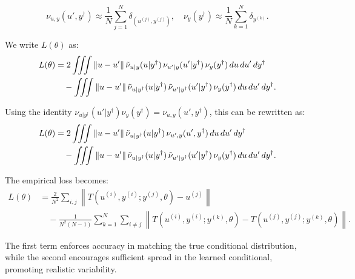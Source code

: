 \documentclass[twoside,11pt]{article}
\begin{document}
\[
\nu_{u,y}(u', y^\dag) \approx \frac{1}{N} \sum_{j=1}^N \delta_{(u^{(j)}, y^{(j)})}, \quad \nu_y(y^\dag) \approx \frac{1}{N} \sum_{k=1}^N \delta_{y^{(k)}}.
\]




We write \(L(\theta)\) as:
\begin{align*}
    L(\theta) &= 2 \iiint \|u - u'\| \, \Tilde{\nu}_{u|y}(u|y^\dag) \, \nu_{u'|y}(u'|y^\dag) \, \nu_y(y^\dag) \, du \, du' \, dy^\dag \\
    &\quad - \iiint \|u - u'\| \, \Tilde{\nu}_{u|y^\dag}(u|y^\dag) \, \Tilde{\nu}_{u'|y^\dag}(u'|y^\dag) \, \nu_y(y^\dag) \, du \, du' \, dy^\dag.
\end{align*}

Using the identity \(\nu_{u|y^\dag}(u'|y^\dag) \nu_y(y^\dag) = \nu_{u,y}(u', y^\dag)\), this can be rewritten as:
\begin{align*}
    L(\theta) &= 2 \iiint \|u - u'\| \, \Tilde{\nu}_{u|y^\dag}(u|y^\dag) \, \nu_{u',y}(u', y^\dag) \, du \, du' \, dy^\dag \\
    &\quad - \iiint \|u - u'\| \, \Tilde{\nu}_{u|y^\dag}(u|y^\dag) \, \Tilde{\nu}_{u'|y^\dag}(u'|y^\dag) \, \nu_y(y^\dag) \, du \, du' \, dy^\dag.
\end{align*}


The empirical loss becomes:
\[
\begin{aligned}
L(\theta) &= \frac{2}{N^2} \sum_{i,j} \left\| T(u^{(i)}, y^{(i)}; y^{(j)}, \theta) - u^{(j)} \right\| \\
&\quad - \frac{1}{N^2(N-1)} \sum_{k=1}^N \sum_{i \ne j} \left\| T(u^{(i)}, y^{(i)}; y^{(k)}, \theta) - T(u^{(j)}, y^{(j)}; y^{(k)}, \theta) \right\|.
\end{aligned}
\]

The first term enforces accuracy in matching the true conditional distribution, while the second encourages sufficient spread in the learned conditional, promoting realistic variability.



\end{document}
